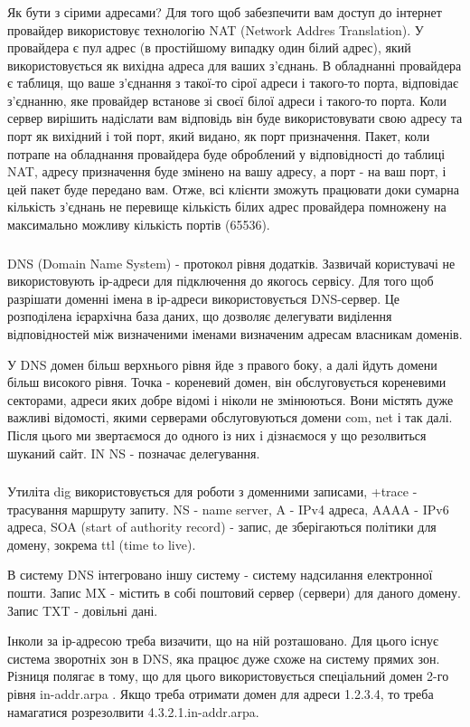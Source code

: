 \documentclass[t]{beamer}  %
\begin{document}
\begin{frame}
 	\frametitle{\insertsection} 
 	\framesubtitle{\insertsubsection}
Як бути з сірими адресами? Для того щоб забезпечити вам доступ до інтернет провайдер використовує технологію NAT (Network Addres Translation). У провайдера є пул адрес (в простійшому випадку один білий адрес), який використовується як вихідна адреса для ваших з'єднань. В обладнанні провайдера є таблиця, що ваше з'єднання з такої-то сірої адреси і такого-то порта, відповідає з'єднанню, яке провайдер встанове зі своєї білої адреси і такого-то порта. Коли сервер вирішить надіслати вам відповідь він буде використовувати свою адресу та порт як вихідний і той порт, який видано, як порт призначення. Пакет, коли потрапе на обладнання провайдера буде оброблений у відповідності до таблиці NAT, адресу призначення буде змінено на вашу адресу, а порт - на ваш порт, і цей пакет буде передано вам. Отже, всі клієнти зможуть працювати доки сумарна кількість з'єднань не перевище кількість білих адрес провайдера помножену на максимально можливу кількість портів (65536).
\end{frame}

\begin{frame}
 	\frametitle{\insertsection} 
 	\framesubtitle{\insertsubsection}
DNS (Domain Name System) - протокол рівня додатків. Зазвичай користувачі не використовують ір-адреси для підключення до якогось сервісу. Для того щоб разрішати доменні імена в ір-адреси використовується DNS-сервер. Це розподілена ієрархічна база даних, що дозволяє делегувати виділення відповідностей між визначеними іменами визначеним адресам власникам доменів. 

У DNS домен більш верхнього рівня йде з правого боку, а далі йдуть домени більш високого рівня. Точка - кореневий домен, він обслуговується кореневими секторами, адреси яких добре відомі і ніколи не змінюються.  Вони містять дуже важливі відомості, якими серверами обслуговуються домени com, net  і так далі. Після цього ми звертаємося до одного із них і дізнаємося у що резолвиться шуканий сайт. IN NS - позначає делегування.
\end{frame}

\begin{frame}
 	\frametitle{\insertsection} 
 	\framesubtitle{\insertsubsection}
Утиліта dig використовується для роботи з доменними записами, +trace - трасування маршруту запиту.  NS - name server, A - IPv4 адреса, AAAA - IPv6 адреса, SOA (start of authority record) - запис, де зберігаються політики для домену, зокрема ttl (time to live).

В систему DNS інтегровано іншу систему - систему надсилання електронної пошти. Запис MX - містить в собі поштовий сервер (сервери) для даного домену. Запис TXT - довільні дані.

Інколи за ір-адресою треба визачити, що на ній розташовано. Для цього існує система зворотніх зон в DNS, яка працює дуже схоже на систему прямих зон. Різниця полягає в тому, що для цього використовується спеціальний домен 2-го рівня in-addr.arpa . Якщо треба отримати домен для адреси 1.2.3.4, то треба намагатися розрезолвити 4.3.2.1.in-addr.arpa.
\end{frame}
\end{document}
